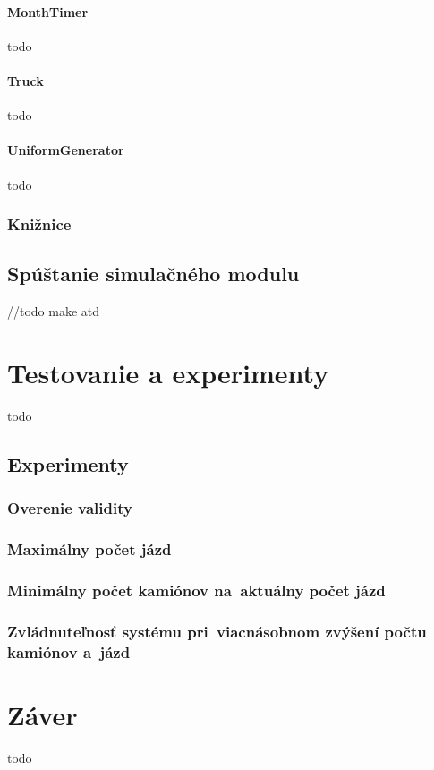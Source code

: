 \documentclass[a4paper, 11pt]{article}
\begin{document}
    \paragraph{MonthTimer}
    todo
    \paragraph{Truck}
    todo
    \paragraph{UniformGenerator}
    todo

    \subsubsection{Knižnice}

    \subsection{Spúštanie simulačného modulu}
    //todo make atd

    \newpage
	\section{Testovanie a experimenty}
	todo 
    \subsection{Experimenty}
    \subsubsection{Overenie validity}
    \subsubsection{Maximálny počet jázd}
    \subsubsection{Minimálny počet kamiónov na~aktuálny počet jázd}
    \subsubsection{Zvládnuteľnosť systému pri~viacnásobnom zvýšení počtu kamiónov a~jázd}

    \newpage
	\section{Záver}
	todo 
\end{document}
